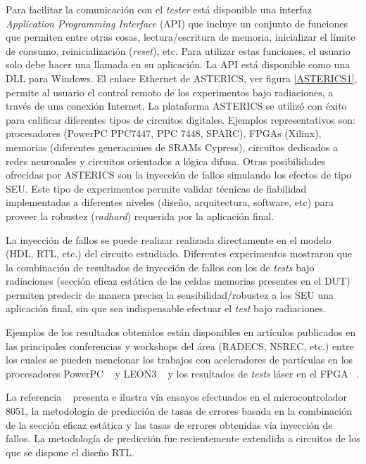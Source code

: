 \documentclass[a4paper,openright,12pt]{report}
\begin{document}
 Para facilitar la comunicación con el \textit{tester} está disponible una interfaz \textit{Application Programming Interface} (API) que incluye un conjunto de funciones que permiten entre otras cosas, lectura/escritura de memoria, inicializar  el límite de consumo, reinicialización (\textit{reset}), etc. Para utilizar estas funciones, el usuario solo debe hacer una llamada en su aplicación. La API está disponible como una DLL para Windows. 
El enlace Ethernet de ASTERICS, ver figura \ref{ASTERICS1}, permite al usuario el control remoto de los experimentos bajo radiaciones, a través de una conexión Internet. 
La plataforma ASTERICS se utilizó con éxito para calificar diferentes tipos de circuitos digitales. Ejemplos representativos son: procesadores (PowerPC PPC7447, PPC 7448, SPARC), FPGAs (Xilinx), memorias (diferentes generaciones de SRAMs Cypress), circuitos dedicados a redes neuronales y circuitos orientados a lógica difusa. 
Otras posibilidades ofrecidas por ASTERICS son la inyección de fallos simulando los efectos de tipo SEU. Este tipo de experimentos permite validar técnicas de fiabilidad implementadas a diferentes niveles (diseño, arquitectura, software, etc)  para proveer la robustez (\textit{radhard}) requerida por la aplicación final. 

La inyección de fallos se puede realizar realizada directamente en el modelo (HDL, RTL, etc.) del circuito estudiado. Diferentes experimentos  mostraron que la combinación de resultados de inyección de fallos con los de \textit{tests} bajo radiaciones (sección eficaz estática de las celdas memorias presentes en el DUT) permiten predecir de manera precisa la sensibilidad/robustez a los SEU una aplicación final, sin que sea indispensable efectuar el \textit{test} bajo radiaciones. 

Ejemplos de los resultados obtenidos están disponibles en artículos publicados en las principales conferencias y workshops del área (RADECS, NSREC, etc.) entre los cuales se pueden mencionar los trabajos con aceleradores de partículas en los procesadores  PowerPC ~\cite{4677290} y LEON3 ~\cite{1589184} y los resultados de \textit{tests} láser en el FPGA ~\cite{4567109}. 

La referencia ~\cite{960357} presenta e ilustra vía ensayos efectuados en el microcontrolador 8051, la metodología de predicción de tasas de errores basada en la combinación de la sección eficaz estática y las tasas de errores obtenidas vía inyección de fallos. La metodología de predicción fue recientemente extendida a circuitos de los que se dispone el diseño RTL.
\end{document}
